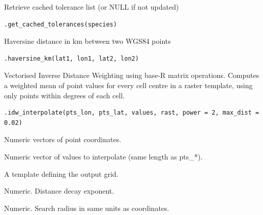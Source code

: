 \documentclass[a4paper]{book}
\begin{document}
%
\begin{Description}
Retrieve cached tolerance list (or NULL if not updated)
\end{Description}
%
\begin{Usage}
\begin{verbatim}
.get_cached_tolerances(species)
\end{verbatim}
\end{Usage}
%
\begin{Description}
Haversine distance in km between two WGS84 points
\end{Description}
%
\begin{Usage}
\begin{verbatim}
.haversine_km(lat1, lon1, lat2, lon2)
\end{verbatim}
\end{Usage}
%
\begin{Description}
Vectorised Inverse Distance Weighting using base-R matrix operations.
Computes a weighted mean of point values for every cell centre in a raster
template, using only points within  degrees of each cell.
\end{Description}
%
\begin{Usage}
\begin{verbatim}
.idw_interpolate(pts_lon, pts_lat, values, rast, power = 2, max_dist = 0.02)
\end{verbatim}
\end{Usage}
%
\begin{Arguments}
\begin{ldescription}
\item[\code{pts\_lon}, \code{pts\_lat}] Numeric vectors of point coordinates.

\item[\code{values}] Numeric vector of values to interpolate (same length as pts\_*).

\item[\code{rast}] A  template defining the output grid.

\item[\code{power}] Numeric. Distance decay exponent.

\item[\code{max\_dist}] Numeric. Search radius in same units as coordinates.
\end{ldescription}
\end{Arguments}
\end{document}
